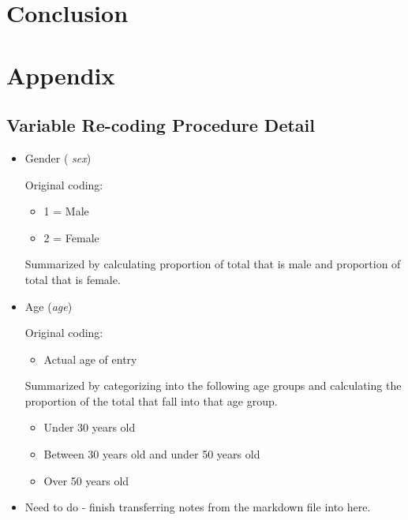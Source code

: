 \documentclass{article}
\begin{document}
\section{Conclusion}

\section{Appendix}

\subsection{Variable Re-coding Procedure Detail}

\begin{itemize}
\item
Gender ( \emph{sex})

Original coding:
\begin{itemize}
\item
1 = Male
\item
2 = Female
\end{itemize}
Summarized by calculating proportion of total that is male and proportion of total that is female.

\item
Age (\emph{age})

Original coding:
\begin{itemize}
\item
Actual age of entry
\end{itemize}
Summarized by categorizing into the following age groups and calculating the proportion of the total that fall into that age group.
\begin{itemize}
\item
Under 30 years old
\item
Between 30 years old and under 50 years old
\item
Over 50 years old
\end{itemize}

\item
Need to do - finish transferring notes from the markdown file into here.

\end{itemize}
\end{document}

